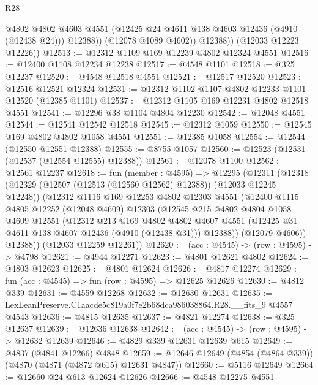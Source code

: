 \begin{lexlean}{R28}
\begin{coremodule}
                @4802
                @4802
                @4603
                @4551
                (@12425 @24 @4611 @138 @4603 @12436 (@4910 (@12438 @24)))
                @12388))
            (@12078 @1089 @4602))
          @12388))
      (@12033 @12223 @12226))
@12513 := @12312 @1109 @169 @12239 @4802 @12324 @4551
@12516 := @12400 @1108 @12234 @12238
@12517 := @4548 @1101
@12518 := @325 @12237
@12520 := @4548 @12518 @4551
@12521 := @12517 @12520
@12523 := @12516 @12521 @12324
@12531 := @12312 @1102 @1107 @4802 @12233 @1101 @12520 (@12385 @1101)
@12537 := @12312 @1105 @169 @12231 @4802 @12518 @4551
@12541 := @12296 @38 @1104 @4804 @12230
@12542 := @12048 @4551
@12544 := @12541 @12542 @12518
@12545 := @12312 @1059
@12550 := @12545 @169 @4802 @4802 @1058 @4551
@12551 := @12385 @1058
@12554 := @12544 (@12550 @12551 @12388)
@12555 := @8755 @1057
@12560 := @12523 (@12531 (@12537 (@12554 @12555) @12388))
@12561 := @12078 @1100
@12562 := @12561 @12237
@12618 := fun (member : @4595) =>
  @12295
    (@12311
      (@12318
        (@12329 (@12507 (@12513 (@12560 @12562) @12388)) (@12033 @12245 @12248))
        (@12312
          @1116
          @169
          @12253
          @4802
          @12303
          @4551
          (@12400
            @1115
            @4805
            @12252
            (@12048 @4609)
            @12303
            (@12545
              @215
              @4802
              @4804
              @1058
              @4609
              @12551
              (@12312
                @213
                @169
                @4802
                @4802
                @4607
                @4551
                (@12425 @31 @4611 @138 @4607 @12436 (@4910 (@12438 @31)))
                @12388))
            (@12079 @4606))
          @12388))
      (@12033 @12259 @12261))
@12620 := (acc : @4545) -> (row : @4595) -> @4798
@12621 := @4944 @12271
@12623 := @4801 @12621 @4802
@12624 := @4803 @12623
@12625 := @4801 @12624
@12626 := @4817 @12274
@12629 := fun (acc : @4545) => fun (row : @4595) => @12625 @12626
@12630 := @4812 @339
@12631 := @4559 @12268
@12632 := @12630 @12631
@12635 := LexLeanPreserve.C1aacde5c819a0f7e2b68dca986038864.R28.__fits_9 @4557 @4543
@12636 := @4815 @12635
@12637 := @4821 @12274
@12638 := @325 @12637
@12639 := @12636 @12638
@12642 := (acc : @4545) -> (row : @4595) -> @12632 @12639
@12646 := @4829 @339 @12631 @12639 @615
@12649 := @4837 (@4841 @12266) @4848
@12659 := @12646 @12649 (@4854 (@4864 @339)) (@4870 (@4871 (@4872 @615) @12631 @4847))
@12660 := @5116 @12649
@12664 := @12660 @24 @613 @12624 @12626
@12666 := @4548 @12275 @4551

\end{coremodule}
\end{lexlean}
